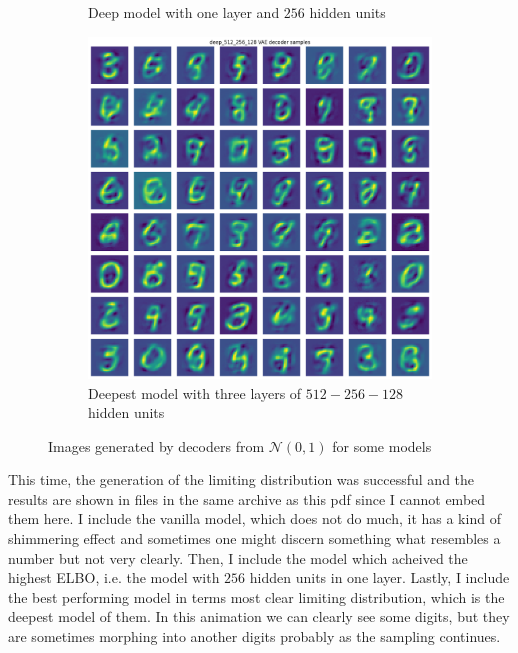 \documentclass[a4paper,11pt]{article}
\begin{document}
\begin{figure}[ht]
\begin{subfigure}[t]{0.35\textwidth}
        \caption{Deep model with one layer and $256$ hidden units}
    \end{subfigure}
    \begin{subfigure}[t]{0.35\textwidth}
        \includegraphics[width=\textwidth]{../images/64_decoder_512_256_128.png}
        \caption{Deepest model with three layers of $512-256-128$ hidden units}
    \end{subfigure}
    \caption{Images generated by decoders from $\mathcal{N}(0, 1)$ for some models}
    \label{fig:64_generations}
\end{figure}

This time, the generation of the limiting distribution was successful and the results are shown in files in the same archive as this pdf since I cannot embed them here.
I include the vanilla model, which does not do much, it has a kind of shimmering effect and sometimes one might discern something what resembles a number but not very clearly.
Then, I include the model which acheived the highest ELBO, i.e. the model with $256$ hidden units in one layer.
Lastly, I include the best performing model in terms most clear limiting distribution, which is the deepest model of them.
In this animation we can clearly see some digits, but they are sometimes morphing into another digits probably as the sampling continues.
\end{document}
